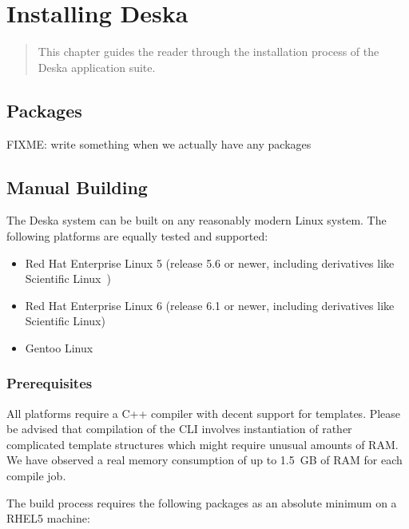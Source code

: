 \documentclass[deska]{subfiles}
\begin{document}
\chapter{Installing Deska}
\label{sec:building}

\begin{abstract}
This chapter guides the reader through the installation process of the Deska application suite.
\end{abstract}

\section{Packages}

FIXME: write something when we actually have any packages

\section{Manual Building}

The Deska system can be built on any reasonably modern Linux system.  The following platforms are equally tested and
supported:

\begin{itemize}
    \item Red Hat Enterprise Linux \cite{rhel} 5 (release 5.6 or newer, including derivatives like Scientific
        Linux~\cite{scientific-linux})
    \item Red Hat Enterprise Linux 6 (release 6.1 or newer, including derivatives like Scientific Linux)
    \item Gentoo Linux~\cite{gentoo}
\end{itemize}

\subsection{Prerequisites}

All platforms require a C++ compiler with decent support for templates.  Please be advised that compilation of the CLI
involves instantiation of rather complicated template structures which might require unusual amounts of RAM.  We have
observed a real memory consumption of up to 1.5~GB of RAM for each compile job.

The build process requires the following packages as an absolute minimum on a RHEL5 machine:
\end{document}
